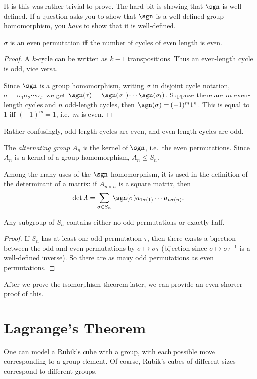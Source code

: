 \documentclass[a4paper]{article}
\begin{document}
It is this was rather trivial to prove. The hard bit is showing that $\sgn$ is well defined. If a question asks you to show that $\sgn$ is a well-defined group homomorphism, you \emph{have} to show that it is well-defined.

\begin{lemma}
  $\sigma$ is an even permutation iff the number of cycles of even length is even.
\end{lemma}

\begin{proof}
  A $k$-cycle can be written as $k - 1$ transpositions. Thus an even-length cycle is odd, vice versa.

  Since $\sgn$ is a group homomorphism, writing $\sigma$ in disjoint cycle notation, $\sigma = \sigma_1\sigma_2\cdots\sigma_l$, we get $\sgn(\sigma) = \sgn(\sigma_1)\cdots \sgn(\sigma_l)$. Suppose there are $m$ even-length cycles and $n$ odd-length cycles, then $\sgn(\sigma) = (-1)^m 1^n$. This is equal to $1$ iff $(-1)^m = 1$, i.e.\ $m$ is even.
\end{proof}
Rather confusingly, odd length cycles are even, and even length cycles are odd.

\begin{defi}
  The \emph{alternating group} $A_n$ is the kernel of $\sgn$, i.e.\ the even permutations.
  Since $A_n$ is a kernel of a group homomorphism, $A_n \leq S_n$.
\end{defi}
Among the many uses of the $\sgn$ homomorphism, it is used in the definition of the determinant of a matrix: if $A_{n\times n}$ is a square matrix, then
\[
  \det A = \sum_{\sigma\in S_n}\sgn(\sigma) a_{1\sigma(1)}\cdots a_{n\sigma(n)}.
\]

\begin{prop}
  Any subgroup of $S_n$ contains either no odd permutations or exactly half.
\end{prop}

\begin{proof}
  If $S_n$ has at least one odd permutation $\tau$, then there exists a bijection between the odd and even permutations by $\sigma \mapsto \sigma\tau$ (bijection since $\sigma \mapsto \sigma \tau^{-1}$ is a well-defined inverse). So there are as many odd permutations as even permutations.
\end{proof}
After we prove the isomorphism theorem later, we can provide an even shorter proof of this.

\section{Lagrange's Theorem}
One can model a Rubik's cube with a group, with each possible move corresponding to a group element. Of course, Rubik's cubes of different sizes correspond to different groups.
\end{document}
